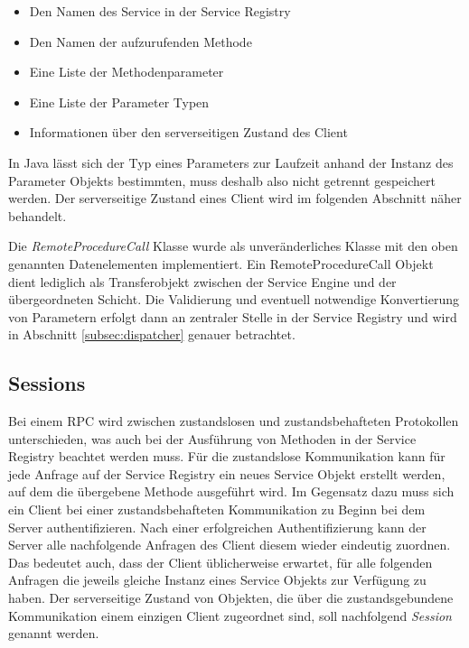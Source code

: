 \begin{itemize}
  \item Den Namen des Service in der Service Registry
  \item Den Namen der aufzurufenden Methode
  \item Eine Liste der Methodenparameter
  \item Eine Liste der Parameter Typen
  \item Informationen über den serverseitigen Zustand des Client
\end{itemize}

In Java lässt sich der Typ eines Parameters zur Laufzeit anhand der Instanz des
Parameter Objekts bestimmten, muss deshalb also nicht getrennt gespeichert
werden. Der serverseitige Zustand eines Client wird im folgenden Abschnitt näher
behandelt.

Die \emph{RemoteProcedureCall} Klasse wurde als unveränderliches Klasse mit den
oben genannten Datenelementen implementiert. Ein RemoteProcedureCall Objekt dient
lediglich als Transferobjekt zwischen der Service Engine und der übergeordneten
Schicht. Die Validierung und eventuell
notwendige Konvertierung von Parametern erfolgt dann an zentraler Stelle in der
Service Registry und wird in Abschnitt \ref{subsec:dispatcher} genauer
betrachtet.

\subsection{Sessions}\label{subsec:sessions}
Bei einem \ac{RPC} wird zwischen zustandslosen und zustandsbehafteten Protokollen
unterschieden, was auch bei der Ausführung von Methoden in der Service Registry
beachtet werden muss. Für die zustandslose Kommunikation kann für jede Anfrage
auf der Service Registry ein neues Service Objekt erstellt werden, auf dem die
übergebene Methode ausgeführt wird. Im Gegensatz dazu muss sich ein Client bei
einer zustandsbehafteten Kommunikation zu Beginn bei dem Server authentifizieren.
Nach einer erfolgreichen Authentifizierung kann der Server alle nachfolgende
Anfragen des Client diesem wieder eindeutig zuordnen. Das bedeutet auch, dass der
Client üblicherweise erwartet, für alle folgenden Anfragen die jeweils gleiche
Instanz eines Service Objekts zur Verfügung zu haben. Der serverseitige Zustand
von Objekten, die über die zustandsgebundene Kommunikation einem einzigen Client
zugeordnet sind, soll nachfolgend \emph{Session} genannt werden.

